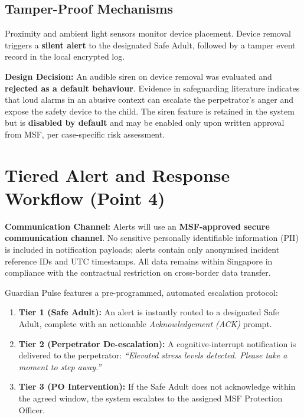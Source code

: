 \documentclass[12pt,a4paper]{article}
\begin{document}
\subsection{Tamper-Proof Mechanisms}
Proximity and ambient light sensors monitor device placement. Device removal triggers a \textbf{silent alert} to the designated Safe Adult, followed by a tamper event record in the local encrypted log.

\begin{warningbox}
\textbf{Design Decision:} An audible siren on device removal was evaluated and \textbf{rejected as a default behaviour}. Evidence in safeguarding literature indicates that loud alarms in an abusive context can escalate the perpetrator's anger and expose the safety device to the child. The siren feature is retained in the system but is \textbf{disabled by default} and may be enabled only upon written approval from MSF, per case-specific risk assessment.
\end{warningbox}

\section{Tiered Alert and Response Workflow (Point 4)}

\begin{warningbox}
\textbf{Communication Channel:} Alerts will use an \textbf{MSF-approved secure communication channel}. No sensitive personally identifiable information (PII) is included in notification payloads; alerts contain only anonymised incident reference IDs and UTC timestamps. All data remains within Singapore in compliance with the contractual restriction on cross-border data transfer.
\end{warningbox}

\vspace{0.3cm}
Guardian Pulse features a pre-programmed, automated escalation protocol:
\begin{enumerate}[leftmargin=*, label=\textbf{\color{primary}\arabic*.}]
    \item \textbf{Tier 1 (Safe Adult):} An alert is instantly routed to a designated Safe Adult, complete with an actionable \textit{Acknowledgement (ACK)} prompt.
    \item \textbf{Tier 2 (Perpetrator De-escalation):} A cognitive-interrupt notification is delivered to the perpetrator: \textit{``Elevated stress levels detected. Please take a moment to step away.''}
    \item \textbf{Tier 3 (PO Intervention):} If the Safe Adult does not acknowledge within the agreed window, the system escalates to the assigned MSF Protection Officer.
\end{enumerate}
\end{document}
